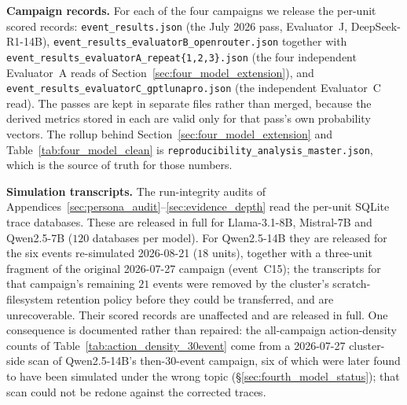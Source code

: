\textbf{Campaign records.} For each of the four campaigns we release the per-unit scored
records: \texttt{event\_results.json} (the July 2026 pass, Evaluator~J,
DeepSeek-R1-14B), \texttt{event\_results\_evaluatorB\_openrouter.json} together with
\texttt{event\_results\_evaluatorA\_repeat\{1,2,3\}.json} (the four independent
Evaluator~A reads of Section~\ref{sec:four_model_extension}), and
\texttt{event\_results\_evaluatorC\_gptlunapro.json} (the independent Evaluator~C read).
The passes are kept in separate files rather than merged, because the derived metrics
stored in each are valid only for that pass's own probability vectors. The rollup behind
Section~\ref{sec:four_model_extension} and Table~\ref{tab:four_model_clean} is
\texttt{reproducibility\_analysis\_master.json}, which is the source of truth for those
numbers.

\textbf{Simulation transcripts.} The run-integrity audits of
Appendices~\ref{sec:persona_audit}--\ref{sec:evidence_depth} read the per-unit SQLite
trace databases. These are released in full for Llama-3.1-8B, Mistral-7B and
Qwen2.5-7B ($120$ databases per model). For Qwen2.5-14B they are released for the six
events re-simulated 2026-08-21 ($18$ units), together with a three-unit fragment of the
original 2026-07-27 campaign (event~C15); the transcripts for that campaign's remaining
$21$ events were removed by the cluster's scratch-filesystem retention policy before
they could be transferred, and are unrecoverable. Their scored records are unaffected
and are released in full. One consequence is documented rather than repaired: the
all-campaign action-density counts of Table~\ref{tab:action_density_30event} come from a
2026-07-27 cluster-side scan of Qwen2.5-14B's then-30-event campaign, six of which were
later found to have been simulated under the wrong topic
(\S\ref{sec:fourth_model_status}); that scan could not be redone against the corrected
traces.

